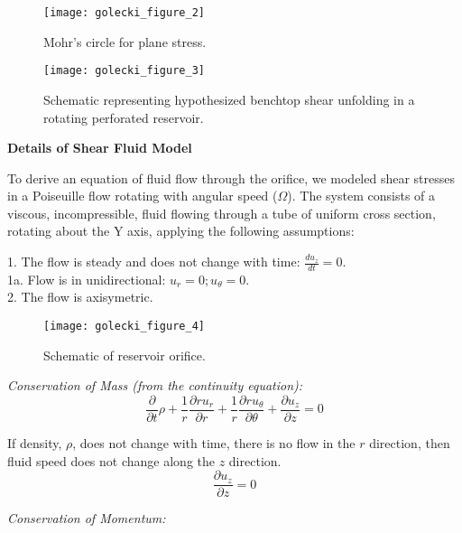 \renewcommand{\thefigure}{2}
\begin{figure}[h]
  \begin{center}
    \texttt{[image: golecki\_figure\_2]}
  \end{center}
  \caption{Mohr's circle for plane stress.}
\end{figure}

\renewcommand{\thefigure}{3}
\begin{figure}[h]
  \begin{center}
    \texttt{[image: golecki\_figure\_3]}
  \end{center}
  \caption{Schematic representing hypothesized benchtop shear unfolding in a rotating perforated reservoir.}
\end{figure}

\noindent
\textbf{Details of Shear Fluid Model}

To derive an equation of fluid flow through the orifice, we modeled shear stresses in a Poiseuille flow rotating with angular speed ($\Omega$). The system consists of a viscous, incompressible, fluid flowing through a tube of uniform cross section, rotating about the Y axis, applying the  following assumptions:

\begin{center}
1. The flow is steady and does not change with time: $\frac{du_z}{dt}=0$.\\
1a. Flow is in unidirectional: $u_r = 0; u_\theta = 0$.\\
2. The flow is axisymetric.
\end{center}

\renewcommand{\thefigure}{4}
\begin{figure}[h]
  \begin{center}
    \texttt{[image: golecki\_figure\_4]}
  \end{center}
  \caption{Schematic of reservoir orifice.}
\end{figure}

\noindent
\textit{Conservation of Mass (from the continuity equation):}
\[\frac{\partial}{\partial t}\rho 
+ \frac{1}{r}\frac{\partial r u_r}{\partial r}
+ \frac{1}{r}\frac{\partial r u_\theta}{\partial \theta}
+ \frac{\partial u_z}{\partial z}
= 0
\]

If density, $\rho$, does not change with time, there is no flow in the $r$ direction, then fluid speed does not change along the $z$ direction.
\[\frac{\partial u_z}{\partial z} = 0\]

\noindent
\textit{Conservation of Momentum:}

